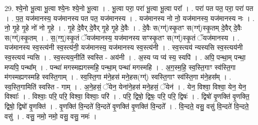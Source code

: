 \documentclass[17pt]{extarticle}
\begin{document}
29. श्ये॒नो भू॒त्वा भू॒त्वा श्ये॒नः श्ये॒नो भू॒त्वा । . भू॒त्वा परा॒ परा॑ भू॒त्वा भू॒त्वा परा᳚ । . परा॑ पत पत॒ परा॒ परा॑ पत । . प॒त॒ यज॑मानस्य॒ यज॑मानस्य पत पत॒ यज॑मानस्य । . यज॑मानस्य नो नो॒ यज॑मानस्य॒ यज॑मानस्य नः । . नो॒ गृ॒हे गृ॒हे नो॑ नो गृ॒हे । . गृ॒हे दे॒वैर् दे॒वैर् गृ॒हे गृ॒हे दे॒वैः । . दे॒वैः स(ग्ग्॑)स्कृ॒तꣳ स(ग्ग्॑)स्कृ॒तम् दे॒वैर् दे॒वैः स(ग्ग्॑)स्कृ॒तम् । . स॒(ग्ग्॒)स्कृ॒तं ॅयज॑मानस्य॒ यज॑मानस्य सꣳस्कृ॒तꣳ स(ग्ग्॑)स्कृ॒तं ॅयज॑मानस्य । . यज॑मानस्य स्व॒स्त्य॑नी स्व॒स्त्य॑नी॒ यज॑मानस्य॒ यज॑मानस्य स्व॒स्त्य॑नी । . स्व॒स्त्यय॑ न्यस्यसि स्व॒स्त्यय॑नी स्व॒स्त्यय॑ न्यसि । . स्व॒स्त्यय॒नीति॑ स्वस्ति - अय॑नी । . अ॒स्य प्य प्य॑ स्य॒ स्यपि॑ । . अपि॒ पन्था॒म् पन्था॒ मप्यपि॒ पन्था᳚म् । . पन्था॑ मगस्मह्यगस्महि॒ पन्था॒म् पन्था॑ मगस्महि । . अ॒ग॒स्म॒हि॒ स्व॒स्ति॒गाꣳ स्व॑स्ति॒गा म॑गस्मह्यगस्महि स्वस्ति॒गाम् । . स्व॒स्ति॒गा म॑ने॒हस॑ मने॒हस(ग्ग्॑) स्वस्ति॒गाꣳ स्व॑स्ति॒गा म॑ने॒हस᳚म् । . स्व॒स्ति॒गामिति॑ स्वस्ति - गाम् । . अ॒ने॒हसं॒ ॅयेन॒ येना॑ने॒हस॑ मने॒हसं॒ ॅयेन॑ । . येन॒ विश्वा॒ विश्वा॒ येन॒ येन॒ विश्वाः᳚ । . विश्वाः॒ परि॒ परि॒ विश्वा॒ विश्वाः॒ परि॑ । . परि॒ द्विषो॒ द्विषः॒ परि॒ परि॒ द्विषः॑ । . द्विषो॑ वृ॒णक्ति॑ वृ॒णक्ति॒ द्विषो॒ द्विषो॑ वृ॒णक्ति॑ । . वृ॒णक्ति॑ वि॒न्दते॑ वि॒न्दते॑ वृ॒णक्ति॑ वृ॒णक्ति॑ वि॒न्दते᳚ । . वि॒न्दते॒ वसु॒ वसु॑ वि॒न्दते॑ वि॒न्दते॒ वसु॑ । . वसु॒ नमो॒ नमो॒ वसु॒ वसु॒ नमः॑ । \newline
\end{document}
